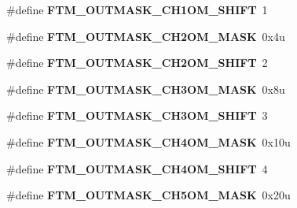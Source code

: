\begin{DoxyCompactItemize}
\item 
\#define {\bfseries F\+T\+M\+\_\+\+O\+U\+T\+M\+A\+S\+K\+\_\+\+C\+H1\+O\+M\+\_\+\+S\+H\+I\+FT}~1\hypertarget{group__FTM__Register__Masks_ga50e5211e18cdbae9c986b49e5ff919f8}{}\label{group__FTM__Register__Masks_ga50e5211e18cdbae9c986b49e5ff919f8}

\item 
\#define {\bfseries F\+T\+M\+\_\+\+O\+U\+T\+M\+A\+S\+K\+\_\+\+C\+H2\+O\+M\+\_\+\+M\+A\+SK}~0x4u\hypertarget{group__FTM__Register__Masks_gabcfafbb8acba84e561a6023f966991c8}{}\label{group__FTM__Register__Masks_gabcfafbb8acba84e561a6023f966991c8}

\item 
\#define {\bfseries F\+T\+M\+\_\+\+O\+U\+T\+M\+A\+S\+K\+\_\+\+C\+H2\+O\+M\+\_\+\+S\+H\+I\+FT}~2\hypertarget{group__FTM__Register__Masks_ga9dca78158dd0cbc591569935f052bab4}{}\label{group__FTM__Register__Masks_ga9dca78158dd0cbc591569935f052bab4}

\item 
\#define {\bfseries F\+T\+M\+\_\+\+O\+U\+T\+M\+A\+S\+K\+\_\+\+C\+H3\+O\+M\+\_\+\+M\+A\+SK}~0x8u\hypertarget{group__FTM__Register__Masks_gae6021cca5706f19ca601ca8d020c4903}{}\label{group__FTM__Register__Masks_gae6021cca5706f19ca601ca8d020c4903}

\item 
\#define {\bfseries F\+T\+M\+\_\+\+O\+U\+T\+M\+A\+S\+K\+\_\+\+C\+H3\+O\+M\+\_\+\+S\+H\+I\+FT}~3\hypertarget{group__FTM__Register__Masks_gaeb20c19e85755256c8336c06d5602852}{}\label{group__FTM__Register__Masks_gaeb20c19e85755256c8336c06d5602852}

\item 
\#define {\bfseries F\+T\+M\+\_\+\+O\+U\+T\+M\+A\+S\+K\+\_\+\+C\+H4\+O\+M\+\_\+\+M\+A\+SK}~0x10u\hypertarget{group__FTM__Register__Masks_ga89efa7258ffb29d1477ca5d7dc9ae870}{}\label{group__FTM__Register__Masks_ga89efa7258ffb29d1477ca5d7dc9ae870}

\item 
\#define {\bfseries F\+T\+M\+\_\+\+O\+U\+T\+M\+A\+S\+K\+\_\+\+C\+H4\+O\+M\+\_\+\+S\+H\+I\+FT}~4\hypertarget{group__FTM__Register__Masks_gacb820bca5f610439c9259fcbf80a75d8}{}\label{group__FTM__Register__Masks_gacb820bca5f610439c9259fcbf80a75d8}

\item 
\#define {\bfseries F\+T\+M\+\_\+\+O\+U\+T\+M\+A\+S\+K\+\_\+\+C\+H5\+O\+M\+\_\+\+M\+A\+SK}~0x20u\hypertarget{group__FTM__Register__Masks_ga36491b140fef946f30510e8028487986}{}\label{group__FTM__Register__Masks_ga36491b140fef946f30510e8028487986}


\end{DoxyCompactItemize}
